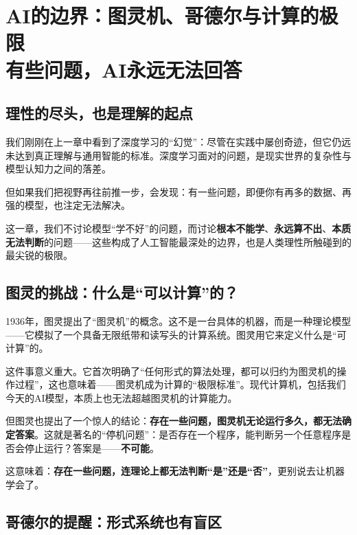  
 \chapter{AI的边界：图灵机、哥德尔与计算的极限 \texorpdfstring{\\}{ }有些问题，AI永远无法回答}

 
\section*{理性的尽头，也是理解的起点}

我们刚刚在上一章中看到了深度学习的“幻觉”：尽管在实践中屡创奇迹，但它仍远未达到真正理解与通用智能的标准。深度学习面对的问题，是现实世界的复杂性与模型认知力之间的落差。

但如果我们把视野再往前推一步，会发现：有一些问题，即便你有再多的数据、再强的模型，也注定无法解决。

这一章，我们不讨论模型“学不好”的问题，而讨论\textbf{根本不能学}、\textbf{永远算不出}、\textbf{本质无法判断}的问题——这些构成了人工智能最深处的边界，也是人类理性所触碰到的最尖锐的极限。

\section*{图灵的挑战：什么是“可以计算”的？}

1936年，图灵提出了“图灵机”的概念。这不是一台具体的机器，而是一种理论模型——它模拟了一个具备无限纸带和读写头的计算系统。图灵用它来定义什么是“可计算”的。

这件事意义重大。它首次明确了“任何形式的算法处理，都可以归约为图灵机的操作过程”，这也意味着——图灵机成为计算的“极限标准”。现代计算机，包括我们今天的AI模型，本质上也无法超越图灵机的计算能力。

但图灵也提出了一个惊人的结论：\textbf{存在一些问题，图灵机无论运行多久，都无法确定答案}。这就是著名的“停机问题”：是否存在一个程序，能判断另一个任意程序是否会停止运行？答案是——\textbf{不可能}。

这意味着：\textbf{存在一些问题，连理论上都无法判断“是”还是“否”}，更别说去让机器学会了。

\section*{哥德尔的提醒：形式系统也有盲区}

